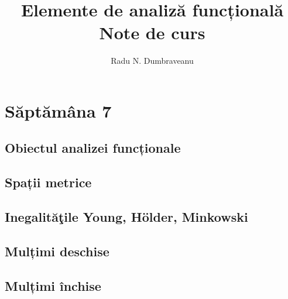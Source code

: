 \documentclass[a4paper,12pt]{article}
\title{Elemente de analiză funcțională\\Note de curs}
\author{Radu N. Dumbraveanu}
\theoremstyle{change}
\begin{document}
\maketitle

\tableofcontents

\section{Săptămâna 7}

\subsection{Obiectul analizei funcționale}


\subsection{Spații metrice}

\subsection{Inegalităţile Young, H\"older, Minkowski}


\subsection{Mulțimi deschise}

\subsection{Mulțimi închise}
\end{document}
